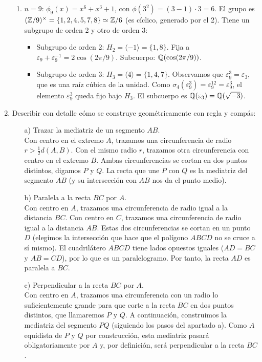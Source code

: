 \begin{enumerate}
\begin{dem}
\begin{enumerate}
        \item \textbf{$n=9$}:
        $\phi_9(x) = x^6+x^3+1$, con $\phi(3^2) =(3-1)\cdot 3 = 6$. 
        El grupo es $(\bb Z/9)^{\times} = \{1,2,4,5,7,8\} \simeq \bb Z/6$ (es cíclico, generado por el 2). Tiene un subgrupo de orden 2 y otro de orden 3:
        \begin{itemize}
            \item Subgrupo de orden 2: $H_2 = \langle -1 \rangle = \{1, 8\}$. Fija a $\varepsilon_9 + \varepsilon_9^{-1} = 2\cos(2\pi/9)$. Subcuerpo: $\bb Q(\cos(2\pi/9))$.
            \item Subgrupo de orden 3: $H_3 = \langle 4 \rangle = \{1, 4, 7\}$. Observamos que $\varepsilon_9^3 = \varepsilon_3$, que es una raíz cúbica de la unidad. Como $\sigma_4(\varepsilon_9^3) = \varepsilon_9^{12} = \varepsilon_9^3$, el elemento $\varepsilon_9^3$ queda fijo bajo $H_3$. El subcuerpo es $\bb Q(\varepsilon_3) = \bb Q(\sqrt{-3})$.
        \end{itemize}
    \end{enumerate}
\end{dem}
  \item Describir con detalle cómo se construye geométricamente con regla y compás:\begin{itemize}
    \item[a)] Trazar la mediatriz de un segmento $AB$. \\ 
    Con centro en el extremo $A$, trazamos una circunferencia de radio $r > \frac{1}{2}d(A,B)$. Con el mismo radio $r$, trazamos otra circunferencia con centro en el extremo $B$. Ambas circunferencias se cortan en dos puntos distintos, digamos $P$ y $Q$. La recta que une $P$ con $Q$ es la mediatriz del segmento $AB$ (y su intersección con $AB$ nos da el punto medio).

    \item[b)] Paralela a la recta $BC$ por $A$. \\ 
    Con centro en $A$, trazamos una circunferencia de radio igual a la distancia $BC$. Con centro en $C$, trazamos una circunferencia de radio igual a la distancia $AB$. Estas dos circunferencias se cortan en un punto $D$ (elegimos la intersección que hace que el polígono $ABCD$ no se cruce a sí mismo). El cuadrilátero $ABCD$ tiene lados opuestos iguales ($AD=BC$ y $AB=CD$), por lo que es un paralelogramo. Por tanto, la recta $AD$ es paralela a $BC$.

    \item[c)] Perpendicular a la recta $BC$ por $A$. \\
    Con centro en $A$, trazamos una circunferencia con un radio lo suficientemente grande para que corte a la recta $BC$ en dos puntos distintos, que llamaremos $P$ y $Q$. A continuación, construimos la mediatriz del segmento $PQ$ (siguiendo los pasos del apartado a). Como $A$ equidista de $P$ y $Q$ por construcción, esta mediatriz pasará obligatoriamente por $A$ y, por definición, será perpendicular a la recta $BC$.


\end{itemize}
\end{enumerate}

